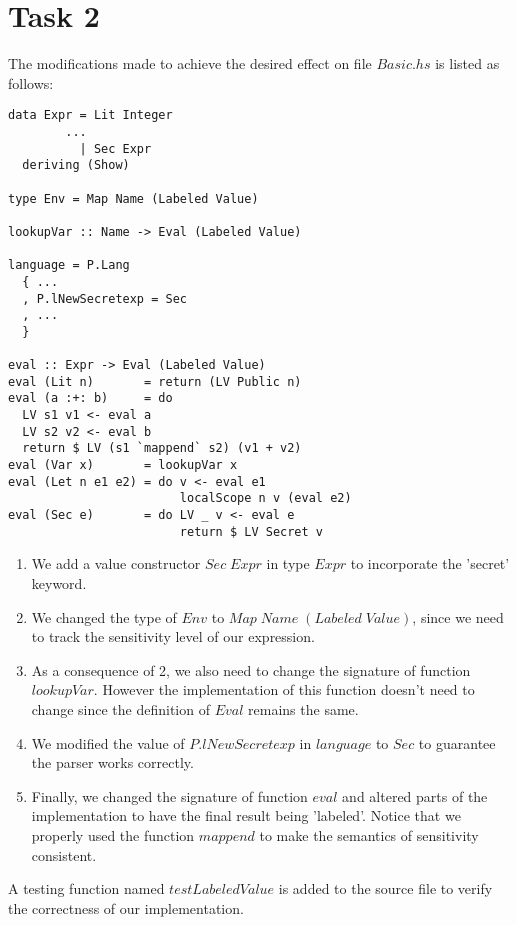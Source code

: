 \documentclass[10pt]{article}
\begin{document}
\section*{Task 2}
The modifications made to achieve the desired effect on file $Basic.hs$ is listed as follows:
\begin{lstlisting}
data Expr = Lit Integer
		...
          | Sec Expr
  deriving (Show)

type Env = Map Name (Labeled Value)

lookupVar :: Name -> Eval (Labeled Value)

language = P.Lang
  { ...
  , P.lNewSecretexp = Sec
  , ...
  }
  
eval :: Expr -> Eval (Labeled Value)
eval (Lit n)       = return (LV Public n)
eval (a :+: b)     = do
  LV s1 v1 <- eval a
  LV s2 v2 <- eval b
  return $ LV (s1 `mappend` s2) (v1 + v2)
eval (Var x)       = lookupVar x
eval (Let n e1 e2) = do v <- eval e1
                        localScope n v (eval e2)
eval (Sec e)       = do LV _ v <- eval e
                        return $ LV Secret v
\end{lstlisting}
\begin{enumerate}
\item We add a value constructor $Sec\; Expr$ in type $Expr$ to incorporate the 'secret' keyword.
\item We changed the type of $Env$ to $Map\; Name\; (Labeled\; Value)$, since we need to track the sensitivity level of our expression.
\item As a consequence of 2, we also need to change the signature of function $lookupVar$. However the implementation of this function doesn't need to change since the definition of $Eval$ remains the same.
\item We modified the value of $P.lNewSecretexp$ in $language$ to $Sec$ to guarantee the parser works correctly.
\item Finally, we changed the signature of function $eval$ and altered parts of the implementation to have the final result being 'labeled'. Notice that we properly used the function $mappend$ to make the semantics  of sensitivity consistent.
\end{enumerate}
A testing function named $testLabeledValue$ is added to the source file to verify the correctness of our implementation. 
\end{document}
